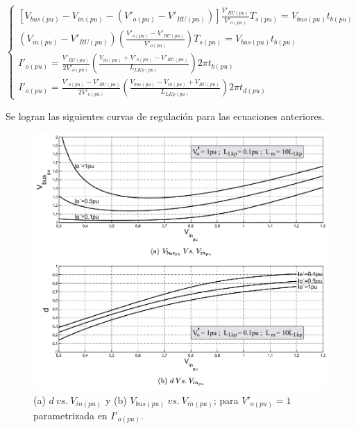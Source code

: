 $$
\begin{cases}
	[V_{bus(pu)}-V_{in(pu)}-(V'_{o(pu)}-V'_{RU(pu)})]\frac{V'_{RU(pu)}}{V'_{o(pu)}}T_{s(pu)}=V_{bus(pu)}t_{b(pu)} \\
	(V_{in(pu)}-V'_{RU(pu)})\left(\frac{V'_{o(pu)}-V'_{RU(pu)}}{V'_{o(pu)}}\right)T_{s(pu)}=V_{bus(pu)}t_{b(pu)} \\
	I'_{o(pu)} = \frac{V'_{RU(pu)}}{2V'_{o(pu)}} \left(\frac{V_{in(pu)}+V'_{o(pu)}-V'_{RU(pu)}}{L_{LKp(pu)}}\right) 2\pi t_{b(pu)} \\
	I'_{o(pu)} = \frac{V'_{o(pu)}-V'_{RU(pu)}}{2V'_{o(pu)}} \left(\frac{V_{bus(pu)}-V_{in(pu)}+V_{RU(pu)}}{L_{LKp(pu)}}\right)2\pi t_{d(pu)}\
\end{cases}
$$

Se logran las siguientes curvas de regulación para las ecuaciones anteriores.

\begin{figure}
	\centering
	\includegraphics[width=0.9\linewidth]{img/eqV}
	\caption{(a) $d \ vs. \ V_{in(pu)}$ y (b) $V_{bus(pu)} \ vs. \ V_{in(pu)}$; para $V'_{o(pu)}=1$ parametrizada en $I'_{o(pu)}$.}
	\label{fig:eqv}
\end{figure}


